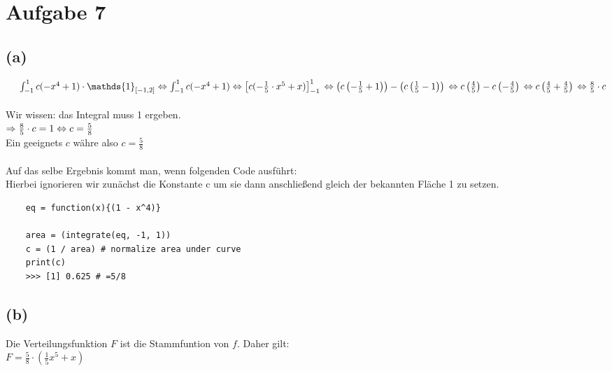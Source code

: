 \documentclass[a4paper]{scrartcl}
\begin{document}
\section*{Aufgabe 7}
\subsection*{(a)}
$
\;\;\;\;\;\int_{-1}^{1} c(-x^4 + 1) \cdot \mathds{1}_{\left[-1,2\right]}\\\\
\Leftrightarrow \int_{-1}^{1} c(-x^4 + 1)\\\\
\Leftrightarrow \left[ c(-\frac{1}{5} \cdot x^5 + x) \right]_{-1}^1\\\\
\Leftrightarrow \left( c \left( -\frac{1}{5} + 1 \right)\right) - \left( c \left( \frac{1}{5} - 1 \right)  \right)\\\\
\Leftrightarrow c \left( \frac{4}{5} \right) - c\left( -\frac{4}{5} \right)\\\\
\Leftrightarrow c \left( \frac{4}{5} + \frac{4}{5} \right)\\\\
\Leftrightarrow \frac{8}{5}  \cdot c
$\\\\
Wir wissen: das Integral muss 1 ergeben.\\
$
\Rightarrow \frac{8}{5} \cdot c = 1\\
\Leftrightarrow c = \frac{5}{8} 
$\\
Ein geeignets $c$ währe also $c=\frac{5}{8}$\\
\\
Auf das selbe Ergebnis kommt man, wenn folgenden Code ausführt:\\
Hierbei ignorieren wir zunächst die Konstante c um sie dann anschließend gleich der bekannten Fläche 1 zu setzen.
\begin{lstlisting}
	eq = function(x){(1 - x^4)}
	
	area = (integrate(eq, -1, 1))
	c = (1 / area) # normalize area under curve
	print(c)
	>>> [1] 0.625 # =5/8
\end{lstlisting}


\subsection*{(b)}
Die Verteilungsfunktion $F$ ist die Stammfuntion von $f$. Daher gilt:\\
$F = \frac{5}{8} \cdot (\frac{1}{5}x^5 + x)$
\end{document}
